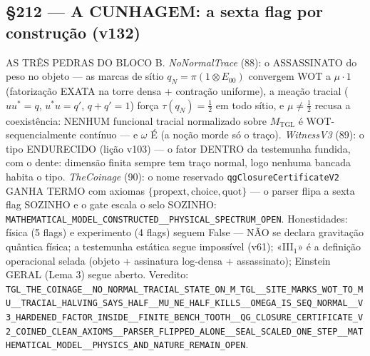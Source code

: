 \documentclass[11pt]{article}
\theoremstyle{definition}\newtheorem{deriv}{Derivação}
\begin{document}
\subsection*{\S212 --- A CUNHAGEM: a sexta flag por construção (v132)}AS TRÊS PEDRAS DO BLOCO B. \emph{NoNormalTrace} (88): o ASSASSINATO do peso no objeto --- as marcas de sítio $q_N=\pi(1\otimes E_{00})$ convergem WOT a $\mu\cdot 1$ (fatorização EXATA na torre densa + contração uniforme), a meação tracial ($u u^*=q$, $u^* u=q'$, $q+q'=1$) força $\tau(q_N)=\tfrac12$ em todo sítio, e $\mu\neq\tfrac12$ recusa a coexistência: NENHUM funcional tracial normalizado sobre $M_{\mathrm{TGL}}$ é WOT-sequencialmente contínuo --- e $\omega$ É (a noção morde só o traço). \emph{WitnessV3} (89): o tipo ENDURECIDO (lição v103) --- o fator DENTRO da testemunha fundida, com o dente: dimensão finita sempre tem traço normal, logo nenhuma bancada habita o tipo. \emph{TheCoinage} (90): o nome reservado \texttt{qgClosureCertificateV2} GANHA TERMO com axiomas $\{\mathrm{propext},\mathrm{choice},\mathrm{quot}\}$ --- o parser flipa a sexta flag SOZINHO e o gate escala o selo SOZINHO: \texttt{MATHEMATICAL\_MODEL\_CONSTRUCTED\_\_PHYSICAL\_SPECTRUM\_OPEN}. Honestidades: física (5 flags) e experimento (4 flags) seguem False --- NÃO se declara gravitação quântica física; a testemunha estática segue impossível (v61); «III$_1$» é a definição operacional selada (objeto + assinatura log-densa + assassinato); Einstein GERAL (Lema 3) segue aberto. Veredito: \texttt{TGL\_THE\_COINAGE\_\_NO\_NORMAL\_TRACIAL\_STATE\_ON\_M\_TGL\_\_SITE\_MARKS\_WOT\_TO\_MU\_\_TRACIAL\_HALVING\_SAYS\_HALF\_\_MU\_NE\_HALF\_KILLS\_\_OMEGA\_IS\_SEQ\_NORMAL\_\_V3\_HARDENED\_FACTOR\_INSIDE\_\_FINITE\_BENCH\_TOOTH\_\_QG\_CLOSURE\_CERTIFICATE\_V2\_COINED\_CLEAN\_AXIOMS\_\_PARSER\_FLIPPED\_ALONE\_\_SEAL\_SCALED\_ONE\_STEP\_\_MATHEMATICAL\_MODEL\_\_PHYSICS\_AND\_NATURE\_REMAIN\_OPEN}.
\end{document}
